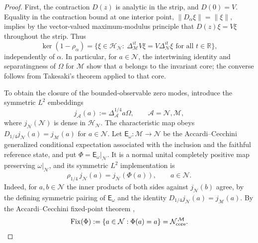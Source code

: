 \documentclass[a4paper,11pt]{article}
\theoremstyle{definition}
\newcommand{\mA}{\mathcal{A}}
\newcommand{\mN}{\mathcal{N}}
\newcommand{\mH}{\mathcal{H}}
\newcommand{\mM}{\mathcal{M}}
\begin{document}
\begin{proof}
First, the contraction $D(z)$ is analytic in the strip, and
$D(0)=V$. Equality in the contraction bound at one interior point,
$\|D_\alpha\xi\|=\|\xi\|$, implies by the vector-valued
maximum-modulus principle that $D(z)\xi=V\xi$ throughout the strip.
Thus
\begin{equation}
 \ker(1-\rho_\alpha)
 =\{\xi\in\mH_\mN:\ 
     \Delta_\mM^{it}V\xi=V\Delta_\mN^{it}\xi
       \text{ for all }t\in\mathbb R\},
 \label{eq:Q-kernel-modular-intertwining}
\end{equation}
independently of $\alpha$. In particular, for $a\in\mN$, the
intertwining identity and separatingness of $\Omega$ for $\mM$
show that $a$ belongs to the invariant core; the converse follows
from Takesaki's theorem applied to that core.

To obtain the closure of the bounded-observable zero modes, introduce
the symmetric $L^2$ embeddings
\begin{equation}
 j_\mA(a):=\Delta_\mA^{1/4}a\Omega,
 \qquad \mA=\mN,\mM,
 \label{eq:Q-symmetric-embedding}
\end{equation}
where $j_\mN(\mN)$ is dense in $\mH_\mN$.
The characteristic map obeys
$D_{1/4}j_\mN(a)=j_\mM(a)$ for $a\in\mN$.
Let $\mathsf E_\omega:\mM\to\mN$ be the
Accardi--Cecchini generalized conditional expectation associated
with the inclusion and the faithful reference state, and put
$\Phi=\mathsf E_\omega|_\mN$. It is a normal unital completely
positive map preserving $\omega|_\mN$, and its symmetric $L^2$
implementation is
\begin{equation}
 \boxed{\rho_{1/4}\,j_\mN(a)=j_\mN(\Phi(a)),
 \qquad a\in\mN.}
 \label{eq:Q-AC-L2}
\end{equation}
Indeed, for $a,b\in\mN$ the inner products of both sides
against $j_\mN(b)$ agree, by the defining symmetric pairing of
$\mathsf E_\omega$ and the identity
$D_{1/4}j_\mN(a)=j_\mM(a)$. By the
Accardi--Cecchini fixed-point theorem \cite{AccardiCecchini1982},
\begin{equation}
 \operatorname{Fix}(\Phi)
 :=\{a\in\mN:\Phi(a)=a\}
 =\mN_{\rm core}^{\,\mM}.
 \label{eq:Q-AC-fixed-point}
\end{equation}


\end{proof}
\end{document}
